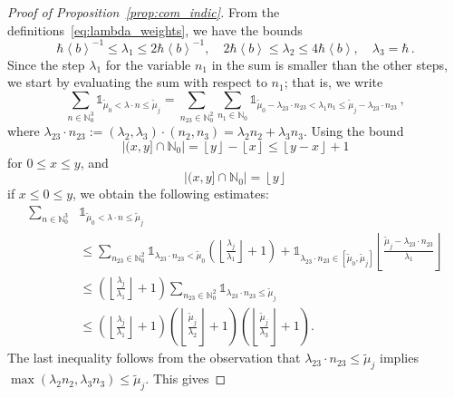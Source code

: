 \documentclass[11pt]{amsart}
\theoremstyle{plain}
\theoremstyle{definition}
\newcommand		{\N}		{\mathbb N}			%
\newcommand		{\lt}			{\left}				%
\newcommand		{\rt}			{\right}			%
\renewcommand	{\(}			{\lt(}
\renewcommand	{\)}			{\rt)}
\newcommand		{\floor}[1]		{\lt\lfloor{#1}\rt\rfloor}
\newcommand		{\bangle}[1]	{\lt\langle #1\rt\rangle}
\newcommand		{\weight}[1]	{\bangle{#1}}	%
\newcommand		{\n}[1]			{\lt\lvert #1 \rt\rvert}
\newcommand		{\indic}	{\mathds{1}}		%
\begin{document}
\begin{proof}[Proof of Proposition~\ref{prop:com_indic}]
        From the definitions~\eqref{eq:lambda_weights}, we have the bounds 
        \begin{equation*}
            \hbar\weight{b}^{-1}\leq\lambda_1 \le 2\hbar\weight{b}^{-1}, \quad 2\hbar\weight{b}\leq\lambda_2 \le 4\hbar\weight{b}, \quad \lambda_3 = \hbar \, .
        \end{equation*}
        Since the step $\lambda_1$ for the variable $n_1$ in the sum is smaller than the other steps, we start by evaluating the sum with respect to $n_1$; that is, we write
        \begin{equation*}
            \sum_{n\in \N_0^3} \indic_{\tilde{\mu}_0 < \lambda\cdot n\leq \tilde{\mu}_j} = \sum_{n_{23}\in \N_0^2} \sum_{n_1\in \N_0} \indic_{\tilde{\mu}_0 - \lambda_{23}\cdot n_{23} < \lambda_1 n_1\leq \tilde{\mu}_j - \lambda_{23}\cdot n_{23}} \, ,
        \end{equation*}
        where $\lambda_{23}\cdot n_{23} := (\lambda_2, \lambda_3)\cdot (n_2, n_3) = \lambda_2 n_2+\lambda_3 n_3$. Using the bound
        \begin{equation*}
            \n{(x,y]\cap\N_0} = \floor{y}-\floor{x} \leq \floor{y-x}+1
        \end{equation*}
        for $0\leq x\leq y$, and
        \begin{equation*}
            \n{(x,y]\cap\N_0} = \floor{y}
        \end{equation*}
        if $x\leq 0 \leq y$, we obtain the following estimates:
        \begin{align*}
            \sum_{n\in \N_0^3} &\indic_{\tilde{\mu}_0 < \lambda\cdot n\leq \tilde{\mu}_j}
            \\
            &\leq \sum_{n_{23}\in \N_0^2} \indic_{\lambda_{23}\cdot n_{23} < \tilde{\mu}_0} \lt(\floor{\tfrac{\lambda_j}{\lambda_1}}+1\rt) + \indic_{\lambda_{23}\cdot n_{23} \in [\tilde{\mu}_0,\tilde{\mu}_j]} \floor{\tfrac{\tilde{\mu}_j - \lambda_{23}\cdot n_{23}}{\lambda_1}}
            \\
            &\leq \lt(\floor{\tfrac{\lambda_j}{\lambda_1}}+1\rt) \sum_{n_{23}\in \N_0^2} \indic_{\lambda_{23}\cdot n_{23} \leq \tilde{\mu}_j}
            \\
            &\leq \lt(\floor{\tfrac{\lambda_j}{\lambda_1}} + 1\rt) \lt(\floor{\tfrac{\tilde{\mu}_j}{\lambda_2}} + 1\rt) \lt(\floor{\tfrac{\tilde{\mu}_j}{\lambda_3}} + 1\rt).
        \end{align*}
        The last inequality follows from the observation that $\lambda_{23}\cdot n_{23} \leq \tilde{\mu}_j$ implies $\max(\lambda_2 n_2,\lambda_3 n_3) \leq \tilde{\mu}_j$. This gives

\end{proof}
\end{document}
